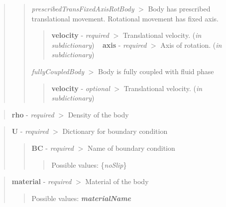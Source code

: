 \begin{quote}
\begin{quote}
\begin{DoxyItemize}
\item {\itshape prescribed\+Trans\+Fixed\+Axis\+Rot\+Body} $>$ Body has prescribed translational movement. Rotational movement has fixed axis. \begin{quote}
{\bfseries{velocity}} -\/ {\itshape required} $>$ Translational velocity. ({\itshape in subdictionary}) ~\newline
 {\bfseries{axis}} -\/ {\itshape required} $>$ Axis of rotation. ({\itshape in subdictionary}) \end{quote}

\item {\itshape fully\+Coupled\+Body} $>$ Body is fully coupled with fluid phase \begin{quote}
{\bfseries{velocity}} -\/ {\itshape optional} $>$ Translational velocity. ({\itshape in subdictionary}) \end{quote}

\end{DoxyItemize}\end{quote}
\end{quote}


\begin{quote}
{\bfseries{rho}} -\/ {\itshape required} $>$ Density of the body \end{quote}


\begin{quote}
{\bfseries{U}} -\/ {\itshape required} $>$ Dictionary for boundary condition \begin{quote}
{\bfseries{BC}} -\/ {\itshape required} $>$ Name of boundary condition \begin{quote}
Possible values\+: \{{\itshape no\+Slip}\} \end{quote}
\end{quote}
\end{quote}


\begin{quote}
{\bfseries{material}} -\/ {\itshape required} $>$ Material of the body \begin{quote}
Possible values\+: {\itshape {\bfseries{material\+Name}}} \end{quote}
\end{quote}


